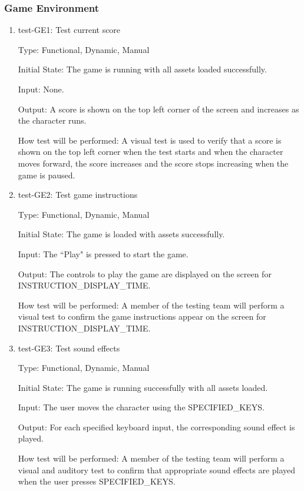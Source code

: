\documentclass[12pt, titlepage]{article}
\begin{document}
\subsubsection{Game Environment}
\begin{enumerate}
\item{test-GE1: Test current score\\}

Type: Functional, Dynamic, Manual
					
Initial State: The game is running with all assets loaded successfully.
					
Input: None.
					
Output: A score is shown on the top left corner of the screen and increases as the character runs.
					
How test will be performed: A visual test is used to verify that a score is shown on the top left corner when the test starts and when the character moves forward, the score increases and the score stops increasing when the game is paused.

\item{test-GE2: Test game instructions\\}

Type: Functional, Dynamic, Manual
					
Initial State: The game is loaded with assets successfully. 
					
Input: The ``Play" is pressed to start the game.
					
Output: The controls to play the game are displayed on the screen for INSTRUCTION\_DISPLAY\_TIME.
					
How test will be performed: A member of the testing team will perform a visual test to confirm the game instructions appear on the screen for INSTRUCTION\_DISPLAY\_TIME.

\item{test-GE3: Test sound effects\\}

Type: Functional, Dynamic, Manual
					
Initial State: The game is running successfully with all assets loaded.
					
Input: The user moves the character using the SPECIFIED\_KEYS.
					
Output: For each specified keyboard input, the corresponding sound effect is played.
					
How test will be performed: A member of the testing team will perform a visual and auditory test to confirm that appropriate sound effects are played when the user presses SPECIFIED\_KEYS.


\end{enumerate}
\end{document}
